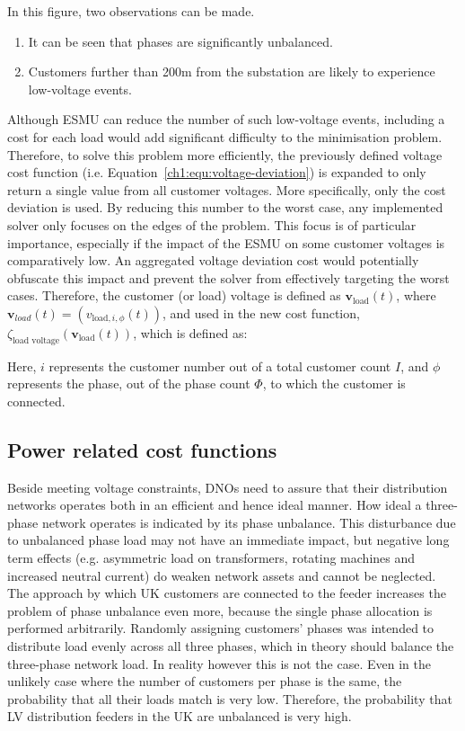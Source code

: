In this figure, two observations can be made.

\begin{enumerate}
	\item It can be seen that phases are significantly unbalanced. 
	\item Customers further than 200m from the substation are likely to experience low-voltage events.
\end{enumerate}

Although ESMU can reduce the number of such low-voltage events, including a cost for each load would add significant difficulty to the minimisation problem.
Therefore, to solve this problem more efficiently, the previously defined voltage cost function (i.e. Equation~\ref{ch1:equ:voltage-deviation}) is expanded to only return a single value from all customer voltages.
More specifically, only the cost deviation is used.
By reducing this number to the worst case, any implemented solver only focuses on the edges of the problem.
This focus is of particular importance, especially if the impact of the ESMU on some customer voltages is comparatively low.
An aggregated voltage deviation cost would potentially obfuscate this impact and prevent the solver from effectively targeting the worst cases.
Therefore, the customer (or load) voltage is defined as $\textbf{v}_\text{load}(t)$, where $\textbf{v}_{load}(t) = (v_{\text{load},i,\phi}(t))$, and used in the new cost function, $\zeta_\text{load voltage}(\textbf{v}_\text{load}(t))$, which is defined as:



Here, $i$ represents the customer number out of a total customer count $I$, and $\phi$ represents the phase, out of the phase count $\Phi$, to which the customer is connected.

\subsection{Power related cost functions}
\label{ch1:subsec:powers-related-cost-functions}

Beside meeting voltage constraints, DNOs need to assure that their distribution networks operates both in an efficient and hence ideal manner.
How ideal a three-phase network operates is indicated by its phase unbalance.
This disturbance due to unbalanced phase load may not have an immediate impact, but negative long term effects (e.g. asymmetric load on transformers, rotating machines and increased neutral current) do weaken network assets and cannot be neglected.
The approach by which UK customers are connected to the feeder increases the problem of phase unbalance even more, because the single phase allocation is performed arbitrarily.
Randomly assigning customers' phases was intended to distribute load evenly across all three phases, which in theory should balance the three-phase network load.
In reality however this is not the case.
Even in the unlikely case where the number of customers per phase is the same, the probability that all their loads match is very low.
Therefore, the probability that LV distribution feeders in the UK are unbalanced is very high.

